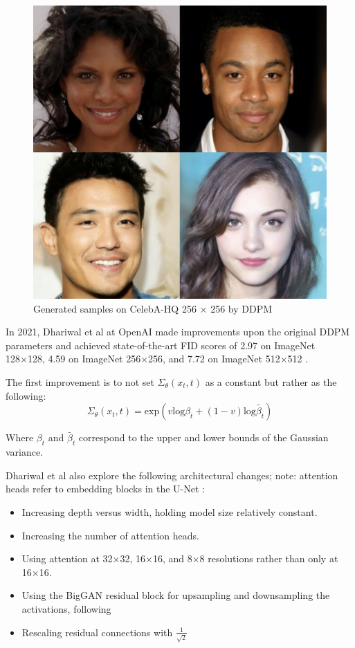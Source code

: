 \documentclass[%
 reprint,
 amsmath,amssymb,
 aps,
]{revtex4-2}
\begin{document}
\begin{figure}[h]
    \includegraphics[width=0.6\columnwidth]{celeb.png}
    \caption{\label{fig:DDPMCeleb} Generated samples on CelebA-HQ 256 × 256 by DDPM \cite{ho2020denoising}}
\end{figure}



In 2021, Dhariwal et al at OpenAI made improvements upon the original DDPM parameters and achieved state-of-the-art FID scores of 2.97 on ImageNet 128×128, 4.59 on ImageNet 256×256, and 7.72 on ImageNet 512×512 \cite{dhariwal2021diffusion}.

The first improvement is to not set $\Sigma_\theta(x_t, t) $ as a constant but rather as the following:
\begin{equation}
\Sigma_\theta(x_t, t) = \mathrm{exp}(v \mathrm{log} \beta_t + (1 - v) \mathrm{log} \tilde{\beta_t})
\end{equation}


Where $\beta_t$ and  $\tilde{\beta_t}$ correspond to the upper and lower bounds of the Gaussian variance.


Dhariwal et al also explore the following architectural changes; note: attention heads refer to embedding blocks in the U-Net  \cite{dhariwal2021diffusion}:
\begin{itemize}
\item Increasing depth versus width, holding model size relatively constant.
\item Increasing the number of attention heads.
\item Using attention at 32×32, 16×16, and 8×8 resolutions rather than only at 16×16.
\item Using the BigGAN residual block for upsampling and downsampling the activations, following
\item Rescaling residual connections with $\frac{1}{\sqrt{2}}$
\end{itemize}
\end{document}
